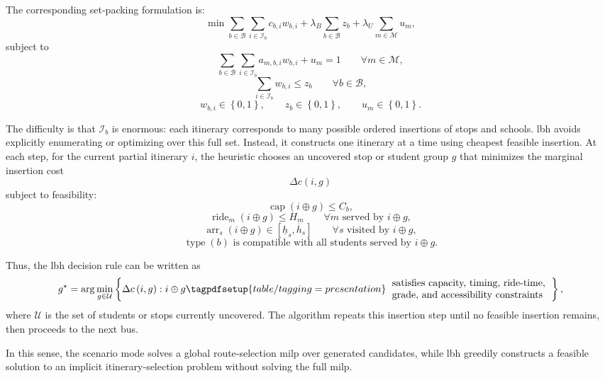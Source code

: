 The corresponding set-packing formulation is:
\[
\min
\sum_{b\in\mathcal{B}}\sum_{i\in\mathcal{I}_b} c_{b,i}w_{b,i}
+ \lambda_B \sum_{b\in\mathcal{B}} z_b
+ \lambda_U \sum_{m\in\mathcal{M}} u_m ,
\]
subject to
\[
\sum_{b\in\mathcal{B}}\sum_{i\in\mathcal{I}_b} a_{m,b,i}w_{b,i} + u_m = 1
\qquad \forall m\in\mathcal{M},
\]
\[
\sum_{i\in\mathcal{I}_b} w_{b,i} \le z_b
\qquad \forall b\in\mathcal{B},
\]
\[
w_{b,i}\in\left\{0,1\right\},
\qquad
z_b\in\left\{0,1\right\},
\qquad
u_m\in\left\{0,1\right\}.
\]

The difficulty is that $\mathcal{I}_b$ is enormous: each itinerary corresponds to many possible ordered insertions of stops and schools. \gls{lbh} avoids explicitly enumerating or optimizing over this full set. Instead, it constructs one itinerary at a time using cheapest feasible insertion. At each step, for the current partial itinerary $i$, the heuristic chooses an uncovered stop or student group $g$ that minimizes the marginal insertion cost
\[
\Delta c\left(i,g\right)
\]
subject to feasibility:
\[
\operatorname{cap}\left(i\oplus g\right) \le C_b,
\]
\[
\operatorname{ride}_m\left(i\oplus g\right) \le H_m
\qquad \forall m \text{ served by } i\oplus g,
\]
\[
\operatorname{arr}_{s}\left(i\oplus g\right) \in \left[\underline{h}_s,\overline{h}_s\right]
\qquad \forall s \text{ visited by } i\oplus g,
\]
\[
\operatorname{type}\left(b\right) \text{ is compatible with all students served by } i\oplus g.
\]

Thus, the \gls{lbh} decision rule can be written as
\[
g^\star
=
\arg\min_{g\in\mathcal{U}}
\left\{
\Delta c\left(i,g\right)
:
i\oplus g {\tagpdfsetup{table/tagging=presentation}\begin{tabular}{l} satisfies capacity, timing, ride-time, \\ grade, and accessibility constraints\end{tabular}} %
\right\},
\]
where $\mathcal{U}$ is the set of students or stops currently uncovered. The algorithm repeats this insertion step until no feasible insertion remains, then proceeds to the next bus.

In this sense, the scenario mode solves a global route-selection \gls{milp} over generated candidates, while \gls{lbh} greedily constructs a feasible solution to an implicit itinerary-selection problem without solving the full \gls{milp}.

